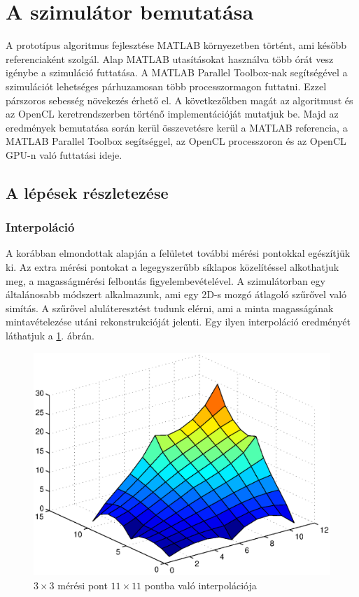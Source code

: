  \section{A szimulátor bemutatása} 
 A prototípus algoritmus fejlesztése MATLAB környezetben történt, ami később
 referenciaként szolgál.
 Alap MATLAB utasításokat használva több órát vesz igénybe a szimuláció
 futtatása.
 A MATLAB Parallel Toolbox-nak segítségével a szimulációt lehetséges
 párhuzamosan több processzormagon futtatni. Ezzel párszoros sebesség
 növekezés érhető el.
 A következőkben magát az algoritmust és az OpenCL keretrendszerben történő
 implementációját mutatjuk be.
 Majd az eredmények bemutatása során kerül összevetésre kerül a MATLAB
 referencia, a MATLAB Parallel Toolbox segítséggel, az OpenCL processzoron és
 az OpenCL GPU-n való futtatási ideje.
	
	\subsection{A lépések részletezése} 
		\subsubsection{Interpoláció}
		A korábban elmondottak alapján a felületet további mérési pontokkal egészítjük ki.
		Az extra mérési pontokat a legegyszerűbb síklapos közelítéssel alkothatjuk meg,
		a magasságmérési felbontás figyelembevételével.
		A szimulátorban egy általánosabb módszert alkalmazunk,
		ami egy 2D-s mozgó átlagoló szűrővel való simítás.
		A szűrővel aluláteresztést tudunk elérni, ami a minta magasságának
		mintavételezése utáni rekonstrukcióját jelenti. Egy ilyen interpoláció
		eredményét láthatjuk a \ref{fig:33pont}. ábrán. 
		
		\begin{figure}[!ht]
			\centering
			\includegraphics[width=0.95\columnwidth]{kepek/3x3_interpol.eps}
			\caption{$3\times3$ mérési pont $11\times11$ pontba való interpolációja}
			\label{fig:33pont}
		\end{figure}
		
